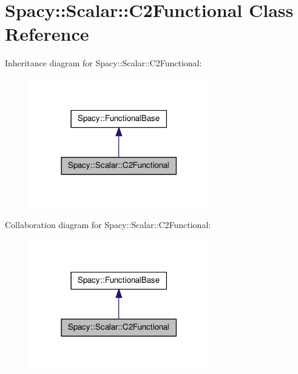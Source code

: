 \hypertarget{classSpacy_1_1Scalar_1_1C2Functional}{\section{\-Spacy\-:\-:\-Scalar\-:\-:\-C2\-Functional \-Class \-Reference}
\label{classSpacy_1_1Scalar_1_1C2Functional}
}


\-Inheritance diagram for \-Spacy\-:\-:\-Scalar\-:\-:\-C2\-Functional\-:
\nopagebreak
\begin{figure}[H]
\begin{center}
\leavevmode
\includegraphics[width=222pt]{classSpacy_1_1Scalar_1_1C2Functional__inherit__graph}
\end{center}
\end{figure}


\-Collaboration diagram for \-Spacy\-:\-:\-Scalar\-:\-:\-C2\-Functional\-:
\nopagebreak
\begin{figure}[H]
\begin{center}
\leavevmode
\includegraphics[width=222pt]{classSpacy_1_1Scalar_1_1C2Functional__coll__graph}
\end{center}
\end{figure}
